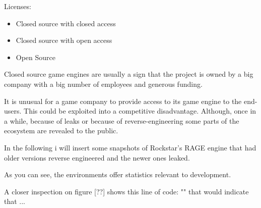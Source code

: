 







        Licenses:

        \begin{itemize}
            \item Closed source with closed access
            \item Closed source with open access
            \item Open Source
        \end{itemize}

        Closed source game engines are usually a sign that the project is owned by a big company with a big number of employees and generous funding.
        
        It is unusual for a game company to provide access to its game engine to the end-users. This could be exploited into a competitive disadvantage.
        Although, once in a while, because of leaks or because of reverse-engineering some parts of the ecosystem are revealed to the public.

        In the following i will insert some snapshots of Rockstar's RAGE engine that had older versions reverse engineered and the newer ones leaked. 
        

        As you can see, the environments offer statistics relevant to development.

        A closer inspection on figure [??] shows this line of code: "" that would indicate that ...



